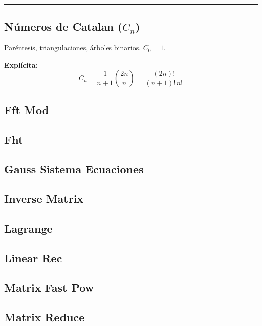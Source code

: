 \documentclass[9pt,portrait,twocolumn,a4paper,notitlepage]{article}
\newcommand\cppfile[2][]{%
\ifstrempty{#1}{}{}%
}
\begin{document}
\rule{\linewidth}{0.2pt}

\subsection*{Números de Catalan ($C_n$)}
Paréntesis, triangulaciones, árboles binarios. $C_0=1$.

\textbf{Explícita:}
$$ C_n = \frac{1}{n+1} \binom{2n}{n} = \frac{(2n)!}{(n+1)!\,n!} $$


\subsection{Fft Mod}
\cppfile{math_clean/fft_mod.cpp}

\subsection{Fht}
\cppfile{math_clean/fht.cpp}

\subsection{Gauss Sistema Ecuaciones}
\cppfile{math_clean/gauss_sistema_ecuaciones.cpp}

\subsection{Inverse Matrix}
\cppfile{math_clean/inverse_matrix.cpp}

\subsection{Lagrange}
\cppfile{math_clean/lagrange.cpp}

\subsection{Linear Rec}
\cppfile{math_clean/linear_rec.cpp}

\subsection{Matrix Fast Pow}
\cppfile{math_clean/matrix_fast_pow.cpp}

\subsection{Matrix Reduce}
\cppfile{math_clean/matrix_reduce.cpp}
\end{document}
